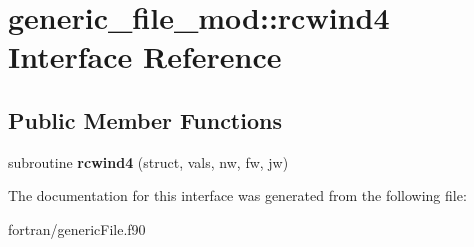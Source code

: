 \hypertarget{interfacegeneric__file__mod_1_1rcwind4}{}\section{generic\+\_\+file\+\_\+mod\+:\+:rcwind4 Interface Reference}
\label{interfacegeneric__file__mod_1_1rcwind4}
\subsection*{Public Member Functions}
\begin{DoxyCompactItemize}
\item 
\mbox{\label{interfacegeneric__file__mod_1_1rcwind4_a4fe80ca279a34b68fbaca6d8eb2c5010}} 
subroutine {\bfseries rcwind4} (struct, vals, nw, fw, jw)
\end{DoxyCompactItemize}


The documentation for this interface was generated from the following file\+:\begin{DoxyCompactItemize}
\item 
fortran/generic\+File.\+f90\end{DoxyCompactItemize}
